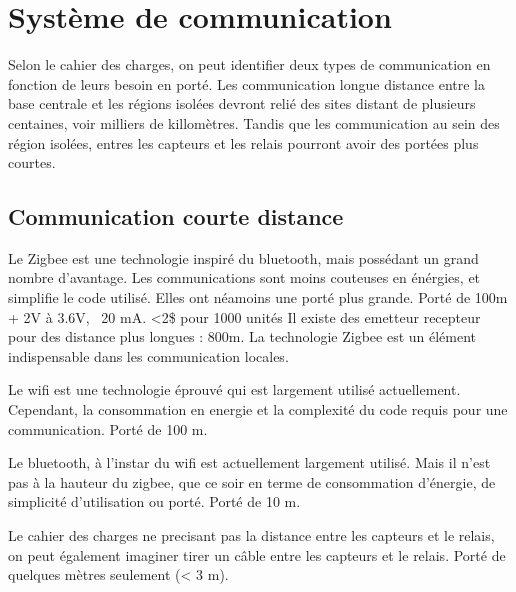 \section{Système de communication}

Selon le cahier des charges, on peut identifier deux types de communication en fonction de leurs besoin en porté.
Les communication longue distance entre la base centrale et les régions isolées devront relié des sites distant de plusieurs centaines, voir milliers de killomètres.
Tandis que les communication au sein des région isolées, entres les capteurs et les relais pourront avoir des portées plus courtes.

    \subsection{Communication courte distance}

            { Le Zigbee est une technologie inspiré du bluetooth, mais possédant un grand nombre d'avantage.
            Les communications sont moins couteuses en énérgies, et simplifie le code utilisé.
            Elles ont néamoins une porté plus grande.}
            {Porté de 100m +}
            {2V à 3.6V, ~20 mA.}
            {<2\$ pour 1000 unités}
            {Il existe des emetteur recepteur pour des distance plus longues : 800m.}
            {La technologie Zigbee est un élément indispensable dans les communication locales.}

            { Le wifi est une technologie éprouvé qui est largement utilisé actuellement.
            Cependant, la consommation en energie et la complexité du code requis pour une communication.}
            {Porté de 100 m.}
            {}
            {}
            {}
            {}

            {Le bluetooth, à l'instar du wifi est actuellement largement utilisé.
            Mais il n'est pas à la hauteur du zigbee, que ce soir en terme de consommation d'énergie, de simplicité d'utilisation ou porté. }
            {Porté de 10 m.}
            {}
            {}
            {}
            {}
            
            { Le cahier des charges ne precisant pas la distance entre les capteurs et le relais, on peut également imaginer tirer un câble entre les capteurs et le relais. }
            {Porté de quelques mètres seulement (< 3 m).}
            {}
            {}
            {}
            {}    
            

